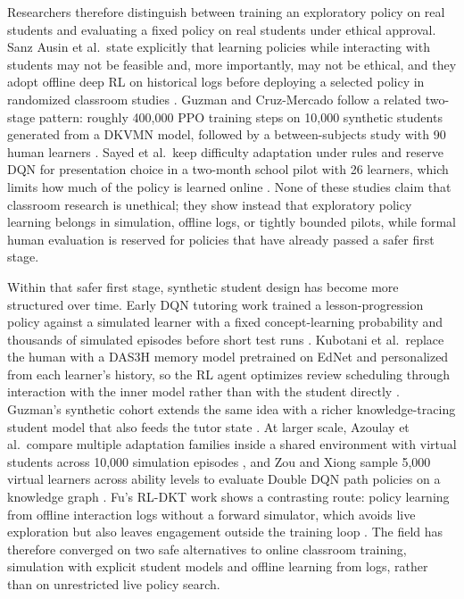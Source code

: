 Researchers therefore distinguish between training an exploratory policy on real students and evaluating a fixed policy on real students under ethical approval. Sanz Ausin et al.\ state explicitly that learning policies while interacting with students may not be feasible and, more importantly, may not be ethical, and they adopt offline deep RL on historical logs before deploying a selected policy in randomized classroom studies \cite{sanz_ausin_leveraging_2019}. Guzman and Cruz-Mercado follow a related two-stage pattern: roughly 400{,}000 PPO training steps on 10{,}000 synthetic students generated from a DKVMN model, followed by a between-subjects study with 90 human learners \cite{guzman_developing_2025}. Sayed et al.\ keep difficulty adaptation under rules and reserve DQN for presentation choice in a two-month school pilot with 26 learners, which limits how much of the policy is learned online \cite{sayed_ai-based_2023}. None of these studies claim that classroom research is unethical; they show instead that exploratory policy learning belongs in simulation, offline logs, or tightly bounded pilots, while formal human evaluation is reserved for policies that have already passed a safer first stage.

Within that safer first stage, synthetic student design has become more structured over time. Early DQN tutoring work trained a lesson-progression policy against a simulated learner with a fixed concept-learning probability and thousands of simulated episodes before short test runs \cite{jezuina_koroveshi_training_2021}. Kubotani et al.\ replace the human with a DAS3H memory model pretrained on EdNet and personalized from each learner's history, so the RL agent optimizes review scheduling through interaction with the inner model rather than with the student directly \cite{kubotani_rltutor_2021}. Guzman's synthetic cohort extends the same idea with a richer knowledge-tracing student model that also feeds the tutor state \cite{guzman_developing_2025}. At larger scale, Azoulay et al.\ compare multiple adaptation families inside a shared environment with virtual students across 10{,}000 simulation episodes \cite{azoulay_adaptive_2021}, and Zou and Xiong sample 5{,}000 virtual learners across ability levels to evaluate Double DQN path policies on a knowledge graph \cite{zou_deep_2026}. Fu's RL-DKT work shows a contrasting route: policy learning from offline interaction logs without a forward simulator, which avoids live exploration but also leaves engagement outside the training loop \cite{fu_integrating_2025}. The field has therefore converged on two safe alternatives to online classroom training, simulation with explicit student models and offline learning from logs, rather than on unrestricted live policy search.


